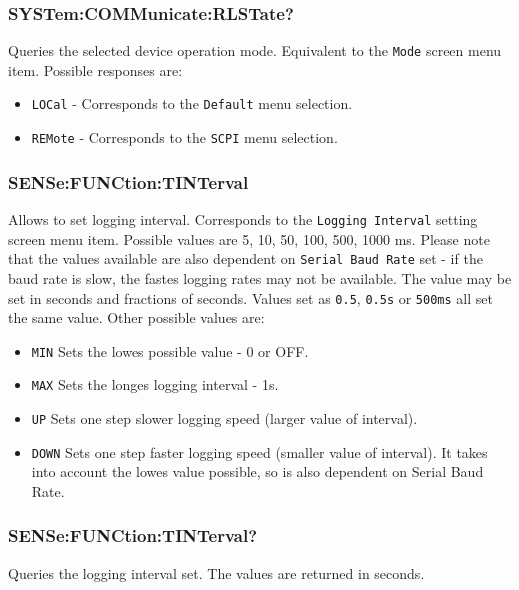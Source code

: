 \documentclass[a4paper,10pt]{article}
\begin{document}
        \subsubsection{SYSTem:COMMunicate:RLSTate?}
                Queries the selected device operation mode. Equivalent to the \verb|Mode| screen menu item.
                Possible responses are:
                \begin{itemize}
                    \item \verb|LOCal|
                        - Corresponds to the \verb|Default| menu selection.
                    \item \verb|REMote|
                        - Corresponds to the \verb|SCPI| menu selection.
                \end{itemize}
        \subsubsection{SENSe:FUNCtion:TINTerval}
                Allows to set logging interval. Corresponds to the \verb|Logging Interval| setting screen menu item.
                Possible values are 5, 10, 50, 100, 500, 1000 ms. Please note that the values available are also dependent on \verb|Serial Baud Rate| set - if the baud rate is slow, the fastes logging rates may not be available.
                The value may be set in seconds and fractions of seconds. Values set as \verb|0.5|, \verb|0.5s| or \verb|500ms| all set the same value.
                Other possible values are:
                \begin{itemize}
                    \item\verb|MIN| Sets the lowes possible value - 0 or OFF.
                    \item\verb|MAX| Sets the longes logging interval - 1s.
                    \item\verb|UP| Sets one step slower logging speed (larger value of interval).
                    \item\verb|DOWN| Sets one step faster logging speed (smaller value of interval). It takes into account the lowes value possible, so is also dependent on Serial Baud Rate. 
                \end{itemize}

        \subsubsection{SENSe:FUNCtion:TINTerval?}
                Queries the logging interval set. The values are returned in seconds.
		\hypertarget{FETCh}{}
\end{document}
